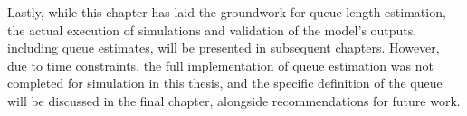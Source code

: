 Lastly, while this chapter has laid the groundwork for queue length estimation, the actual execution of simulations and validation of the model’s outputs, including queue estimates, will be presented in subsequent chapters. However, due to time constraints, the full implementation of queue estimation was not completed for simulation in this thesis, and the specific definition of the queue will be discussed in the final chapter, alongside recommendations for future work.

